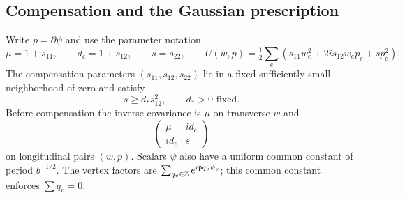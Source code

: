 \subsection{Compensation and the Gaussian prescription}

Write $p=\partial\psi$ and use the parameter notation
\[
 \mu=1+s_{11},\qquad d_c=1+s_{12},\qquad s=s_{22},\qquad
 U(w,p)=\tfrac12\sum_e(s_{11}w_e^2+2i s_{12}w_ep_e+s p_e^2).
\]
The compensation parameters $(s_{11},s_{12},s_{22})$ lie in a fixed
sufficiently small neighborhood of zero and satisfy
\begin{equation}\label{xyh:permitted-parameters}
 s\ge d_*s_{12}^2,\qquad d_*>0\text{ fixed}.
\end{equation}
Before compensation the inverse covariance is $\mu$ on transverse $w$
and
\begin{equation}\label{xyh:inverse-pair}
 \begin{pmatrix}\mu&i d_c\\i d_c&s\end{pmatrix}
\end{equation}
on longitudinal pairs $(w,p)$. Scalars $\psi$ also have a uniform common
constant of period $b^{-1/2}$. The vertex factors are
$\sum_{q_v\in\mathbb Z}e^{i\mathfrak p q_v\psi_v}$; this common constant
enforces $\sum q_v=0$.

